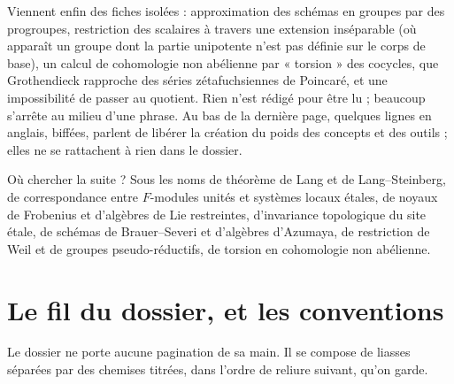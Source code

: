 \documentclass[11pt,a4paper]{article}
\begin{document}
\begin{resume}
Viennent enfin des fiches isolées : approximation des schémas en groupes par
des progroupes, restriction des scalaires à travers une extension
inséparable (où apparaît un groupe dont la partie unipotente n'est pas définie
sur le corps de base), un calcul de cohomologie non abélienne par « torsion »
des cocycles, que Grothendieck rapproche des séries zétafuchsiennes de
Poincaré, et une impossibilité de passer au quotient. Rien n'est rédigé pour
être lu ; beaucoup s'arrête au milieu d'une phrase. Au bas de la dernière
page, quelques lignes en anglais, biffées, parlent de libérer la création du
poids des concepts et des outils ; elles ne se rattachent à rien dans le
dossier.

Où chercher la suite ? Sous les noms de théorème de Lang et de
Lang–Steinberg, de correspondance entre $F$-modules unités et systèmes locaux
étales, de noyaux de Frobenius et d'algèbres de Lie restreintes,
d'invariance topologique du site étale, de schémas de Brauer–Severi et
d'algèbres d'Azumaya, de restriction de Weil et de groupes pseudo-réductifs,
de torsion en cohomologie non abélienne.

\end{resume}

\section*{Le fil du dossier, et les conventions}

Le dossier ne porte aucune pagination de sa main. Il se compose de liasses
séparées par des chemises titrées, dans l'ordre de reliure suivant, qu'on
garde.
\end{document}
